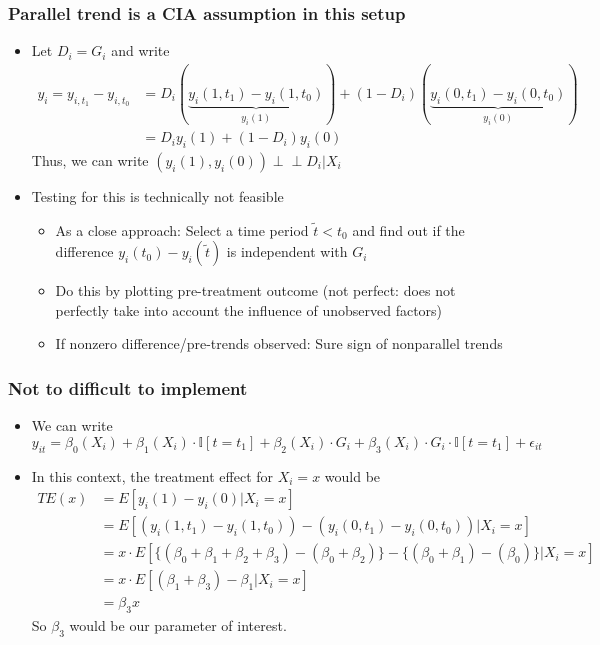 \documentclass[aspectratio=169]{beamer}
\begin{document}
\begin{frame}
\frametitle{Parallel trend is a CIA assumption in this setup}
\begin{itemize}
\item Let $D_i=G_i$ and write
\begin{align*}
y_i = y_{i,t_1}-y_{i,t_0}&=D_i(\underbrace{y_i(1,t_1)-y_i(1,t_0)}_{y_i(1)})+(1-D_i)(\underbrace{y_i(0,t_1)-y_i(0,t_0)}_{y_i(0)})\\
&=D_iy_i(1) + (1-D_i)y_i(0)
\end{align*}
Thus, we can write $(y_i(1), y_i(0)) \perp\!\!\! \perp D_i|X_i$
\item Testing for this is technically not feasible
\begin{itemize}
\item As a close approach: Select a time period $\tilde{t}<t_0$ and find out if the difference $y_i(t_0)-y_i(\tilde{t})$ is independent with $G_i$
\item Do this by plotting  pre-treatment outcome (not perfect: does not perfectly take into account the influence of unobserved factors)
\item If nonzero difference/pre-trends observed: Sure sign of nonparallel trends
\end{itemize}
\end{itemize}
\end{frame}


\begin{frame}
\frametitle{Not to difficult to implement}
\begin{itemize}
\item We can write
\[
y_{it}=\beta_0(X_i)+\beta_1(X_i)\cdot\mathbb{I}[t=t_1]+\beta_2(X_i)\cdot G_i + \beta_3(X_i)\cdot G_i\cdot\mathbb{I}[t=t_1]+\epsilon_{it}
\]
\item In this context, the treatment effect for $X_i=x$ would be
\begin{align*}
TE(x)&=E[y_i(1)-y_i(0)|X_i=x]\\
&=E[(y_i(1,t_1)-y_i(1,t_0))-(y_i(0,t_1)-y_i(0,t_0))|X_i=x]\\
&=x\cdot E[\{(\beta_0+\beta_1+\beta_2+\beta_3)-(\beta_0+\beta_2)\}-\{(\beta_0+\beta_1)-(\beta_0)\}|X_i=x]\\
&=x\cdot E[(\beta_1+\beta_3)-\beta_1|X_i=x]\\
&=\beta_3 x
\end{align*}
So $\beta_3$ would be our parameter of interest.
\end{itemize}
\end{frame}
\end{document}
